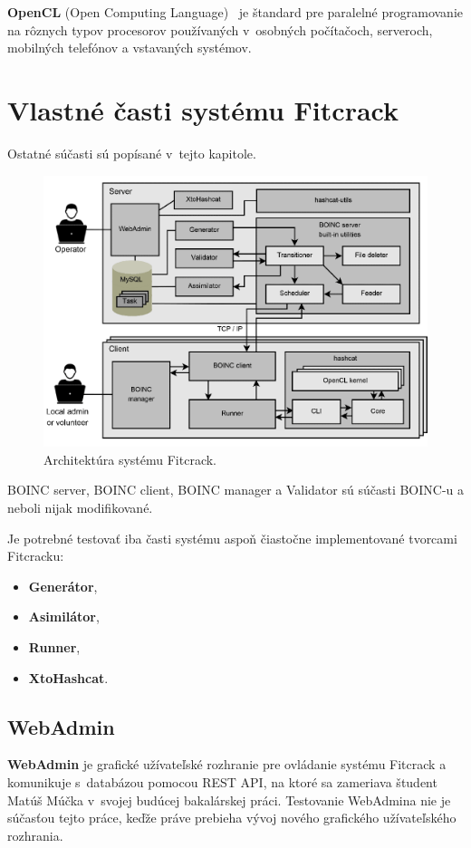 \textbf{OpenCL} (Open Computing Language)~\cite{opencl} je štandard pre paralelné programovanie na rôznych typov procesorov používaných v~osobných počítačoch, serveroch, mobilných telefónov a vstavaných systémov.


\section{Vlastné časti systému Fitcrack}
\label{Fitcrack_casti}
Ostatné súčasti sú popísané v~tejto kapitole.
\begin{figure}[h]
\centering
\includegraphics[width=15cm]{obrazky/fc_arch-1.png}
\caption{Architektúra systému Fitcrack.~\cite{TR_TARZAN}}
\label{fig:fc_arch}
\end{figure}

BOINC server, BOINC client, BOINC manager a Validator sú súčasti BOINC-u a neboli nijak modifikované.

Je potrebné testovať iba časti systému aspoň čiastočne implementované tvorcami Fitcracku:
\begin{itemize}
	\label{tests_moduls}
	\item \textbf{Generátor},
	\item \textbf{Asimilátor},
	\item \textbf{Runner},
	\item \textbf{XtoHashcat}.
\end{itemize}

\subsection{WebAdmin}
\label{webadmin}
\textbf{WebAdmin} je grafické užívateľské rozhranie pre ovládanie systému Fitcrack a komunikuje s~databázou pomocou REST API, na ktoré sa zameriava študent Matúš Múčka v~svojej budúcej bakalárskej práci.
Testovanie WebAdmina nie je súčasťou tejto práce, keďže práve prebieha vývoj nového grafického užívateľského rozhrania.

